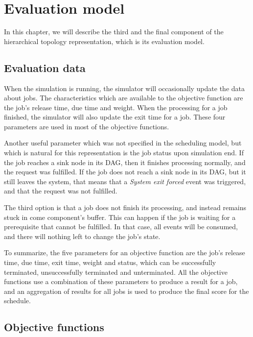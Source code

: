 \chapter{Evaluation model}
\label{sec:evaluation_model}

In this chapter, we will describe the third and the final component of the hierarchical topology representation, which is its evaluation model.

\section{Evaluation data}
\label{sec:evaluation_data}
When the simulation is running, the simulator will occasionally update the data about jobs. The characteristics which are available to the objective function are the job's release time, due time and weight. When the processing for a job finished, the simulator will also update the exit time for a job. These four parameters are used in most of the objective functions.

Another useful parameter which was not specified in the scheduling model, but which is natural for this representation is the job status upon simulation end. If the job reaches a sink node in its DAG, then it finishes processing normally, and the request was fulfilled. If the job does not reach a sink node in its DAG, but it still leaves the system, that means that a \textit{System exit forced} event was triggered, and that the request was not fulfilled. 

The third option is that a job does not finish its processing, and instead remains stuck in come component's buffer. This can happen if the job is waiting for a prerequisite that cannot be fulfilled. In that case, all events will be consumed, and there will nothing left to change the job's state.

To summarize, the five parameters for an objective function are the job's release time, due time, exit time, weight and status, which can be successfully terminated, unsuccessfully terminated and unterminated. All the objective functions use a combination of these parameters to produce a result for a job, and an aggregation of results for all jobs is used to produce the final score for the schedule.

\section{Objective functions}
\label{sec:objective_functions}

